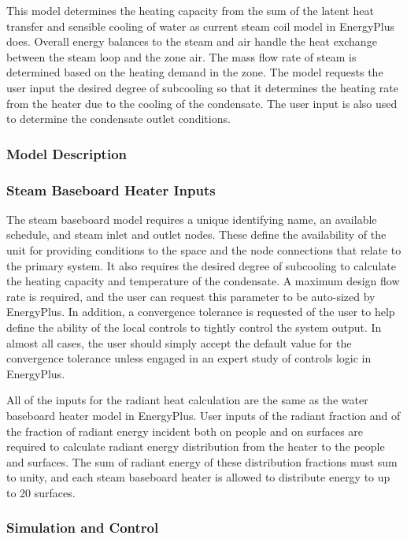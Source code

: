 This model determines the heating capacity from the sum of the latent heat transfer and sensible cooling of water as current steam coil model in EnergyPlus does. Overall energy balances to the steam and air handle the heat exchange between the steam loop and the zone air. The mass flow rate of steam is determined based on the heating demand in the zone. The model requests the user input the desired degree of subcooling so that it determines the heating rate from the heater due to the cooling of the condensate. The user input is also used to determine the condensate outlet conditions.

\subsubsection{Model Description}\label{model-description-1-006}

\subsubsection{Steam Baseboard Heater Inputs}\label{steam-baseboard-heater-inputs}

The steam baseboard model requires a unique identifying name, an available schedule, and steam inlet and outlet nodes. These define the availability of the unit for providing conditions to the space and the node connections that relate to the primary system. It also requires the desired degree of subcooling to calculate the heating capacity and temperature of the condensate. A maximum design flow rate is required, and the user can request this parameter to be auto-sized by EnergyPlus. In addition, a convergence tolerance is requested of the user to help define the ability of the local controls to tightly control the system output. In almost all cases, the user should simply accept the default value for the convergence tolerance unless engaged in an expert study of controls logic in EnergyPlus.

All of the inputs for the radiant heat calculation are the same as the water baseboard heater model in EnergyPlus. User inputs of the radiant fraction and of the fraction of radiant energy incident both on people and on surfaces are required to calculate radiant energy distribution from the heater to the people and surfaces. The sum of radiant energy of these distribution fractions must sum to unity, and each steam baseboard heater is allowed to distribute energy to up to 20 surfaces.

\subsubsection{Simulation and Control}\label{simulation-and-control-1-001}

